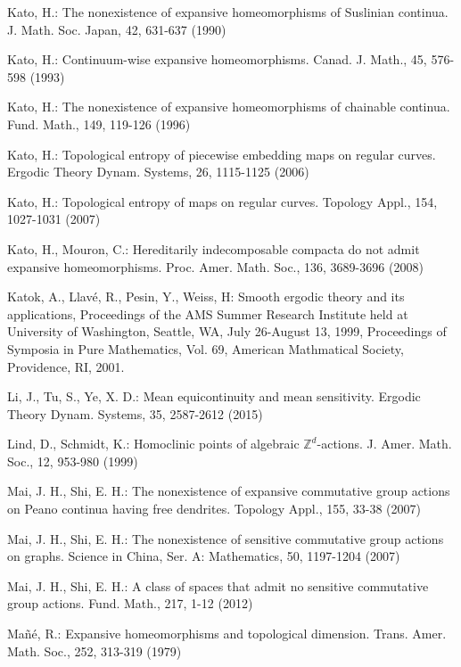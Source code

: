\documentclass[12pt,a4paper]{amsart}
\theoremstyle{definition}
\numberwithin{equation}{section}
\begin{document}
\begin{thebibliography}{HD}

 Kato, H.: The nonexistence of expansive homeomorphisms of Suslinian continua.  {J. Math. Soc. Japan},  {42}, 631-637 (1990)

 Kato, H.: Continuum-wise expansive homeomorphisms.  {Canad. J. Math.},  {45}, 576-598 (1993)

 Kato, H.: The nonexistence of expansive homeomorphisms of chainable continua.  {Fund. Math.},  {149}, 119-126 (1996)

 Kato, H.: Topological entropy of piecewise embedding maps on regular curves.  {Ergodic Theory Dynam. Systems},  {26}, 1115-1125 (2006)

 Kato, H.: Topological entropy of maps on regular curves.  {Topology Appl.},  {154}, 1027-1031 (2007)

 Kato, H., Mouron, C.: Hereditarily indecomposable compacta do not admit expansive homeomorphisms.  {Proc. Amer. Math. Soc.},  {136}, 3689-3696 (2008)

 Katok, A., Llav\'{e}, R., Pesin, Y., Weiss, H: Smooth ergodic theory and its applications, Proceedings of the AMS Summer Research Institute held at University of Washington, Seattle, WA, July 26-August 13, 1999, Proceedings of Symposia in Pure Mathematics, Vol. 69, American Mathmatical Society, Providence, RI, 2001.

 Li, J., Tu, S., Ye, X. D.: Mean equicontinuity and mean sensitivity.  {Ergodic Theory Dynam. Systems},  {35},  2587-2612 (2015)

 Lind, D., Schmidt, K.: Homoclinic points of algebraic ${\mathbb Z}^d$-actions.  {J. Amer. Math. Soc.},  {12},  953-980 (1999)

 Mai, J. H., Shi, E. H.: The nonexistence of expansive commutative group actions on Peano continua having free dendrites.  {Topology Appl.},  {155}, 33-38 (2007)

 Mai, J. H., Shi, E. H.: The nonexistence of sensitive commutative group actions on graphs. {  Science in China, Ser. A: Mathematics},  50, 1197-1204 (2007)

 Mai, J. H., Shi, E. H.: A class of spaces that admit no sensitive commutative group actions.  {Fund. Math.},  {217}, 1-12 (2012)

 Ma\~{n}\'{e}, R.: Expansive homeomorphisms and topological dimension.  {Trans. Amer. Math. Soc.},  {252}, 313-319 (1979)


\end{thebibliography}
\end{document}
